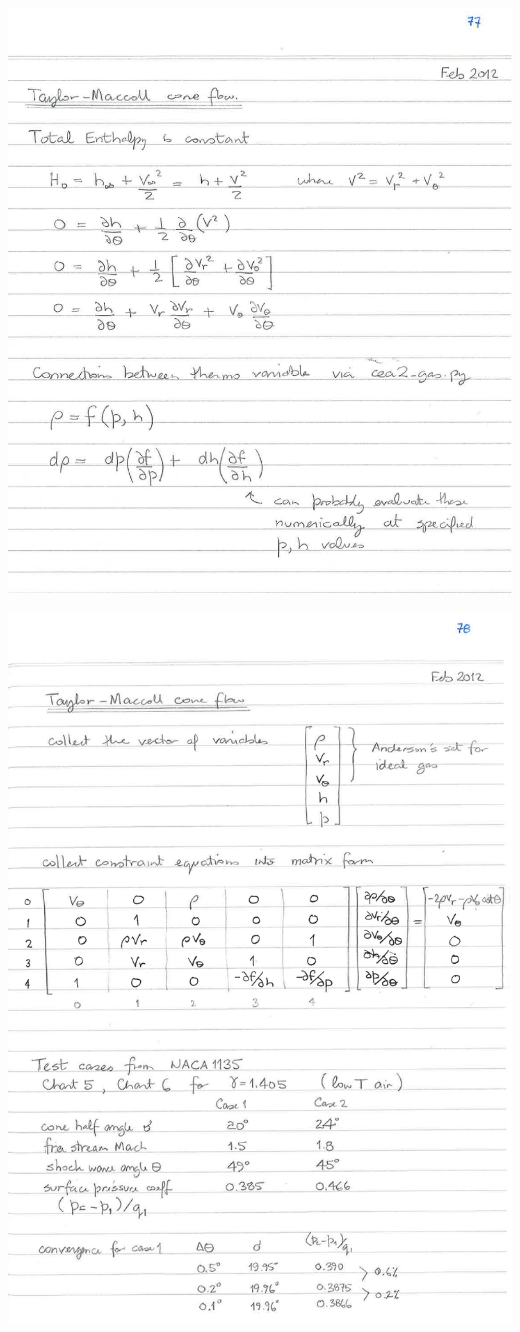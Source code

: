 \documentclass[10pt,a4paper]{article}
\begin{document}
\newpage
\begin{center}
\includegraphics[width=\textwidth]{../figs/pj-workbook-page-77.png}
\end{center}

\newpage
\begin{center}
\includegraphics[width=\textwidth]{../figs/pj-workbook-page-78.png}
\end{center}
\end{document}
